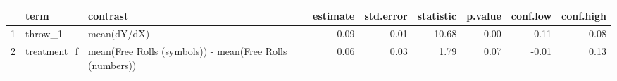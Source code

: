 \begin{table}[ht]
\centering
\begin{tabular}{rllrrrrrr}
  \hline
 & term & contrast & estimate & std.error & statistic & p.value & conf.low & conf.high \\ 
  \hline
1 & throw\_1 & mean(dY/dX) & -0.09 & 0.01 & -10.68 & 0.00 & -0.11 & -0.08 \\ 
  2 & treatment\_f & mean(Free Rolls (symbols)) - mean(Free Rolls (numbers)) & 0.06 & 0.03 & 1.79 & 0.07 & -0.01 & 0.13 \\ 
   \hline
\end{tabular}
\end{table}
